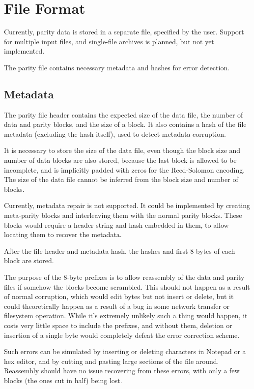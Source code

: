 \chapter{File Format}

Currently, parity data is stored in a separate file, specified by the user.
Support for multiple input files, and single-file archives is planned, but not yet implemented.

The parity file contains necessary metadata and hashes for error detection.

\section{Metadata}

The parity file header contains the expected size of the data file, the number of data and parity blocks, and the size of a block.
It also contains a hash of the file metadata (excluding the hash itself), used to detect metadata corruption.

It is necessary to store the size of the data file, even though the block size and number of data blocks are also stored,
because the last block is allowed to be incomplete, and is implicitly padded with zeros for the Reed-Solomon encoding.
The size of the data file cannot be inferred from the block size and number of blocks.

Currently, metadata repair is not supported. It could be implemented by creating meta-parity blocks and interleaving them with the normal parity blocks.
These blocks would require a header string and hash embedded in them, to allow locating them to recover the metadata.

After the file header and metadata hash, the hashes and first 8 bytes of each block are stored.

The purpose of the 8-byte prefixes is to allow reassembly of the data and parity files if somehow the blocks become scrambled.
This should not happen as a result of normal corruption, which would edit bytes but not insert or delete,
but it could theoretically happen as a result of a bug in some network transfer or filesystem operation.
While it's extremely unlikely such a thing would happen, it costs very little space to include the prefixes,
and without them, deletion or insertion of a single byte would completely defeat the error correction scheme.

Such errors can be simulated by inserting or deleting characters in Notepad or a hex editor, and by cutting and pasting large sections of the file around.
Reassembly should have no issue recovering from these errors, with only a few blocks (the ones cut in half) being lost.

